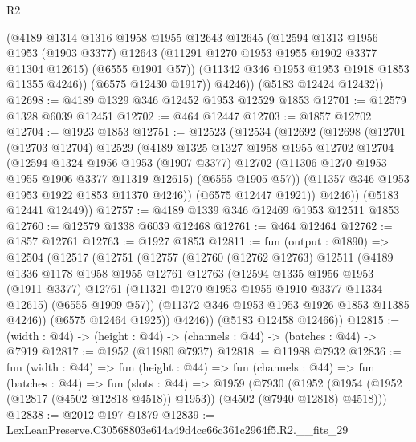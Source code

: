 \begin{lexlean}{R2}
\begin{coremodule}
            (@4189
              @1314
              @1316
              @1958
              @1955
              @12643
              @12645
              (@12594
                @1313
                @1956
                @1953
                (@1903 @3377)
                @12643
                (@11291 @1270 @1953 @1955 @1902 @3377 @11304 @12615)
                (@6555 @1901 @57))
              (@11342 @346 @1953 @1953 @1918 @1853 @11355 @4246))
            (@6575 @12430 @1917))
          @4246))
      (@5183 @12424 @12432))
@12698 := @4189 @1329 @346 @12452 @1953 @12529 @1853
@12701 := @12579 @1328 @6039 @12451
@12702 := @464 @12447
@12703 := @1857 @12702
@12704 := @1923 @1853
@12751 := @12523
    (@12534
      (@12692
        (@12698
          (@12701
            (@12703 @12704)
            @12529
            (@4189
              @1325
              @1327
              @1958
              @1955
              @12702
              @12704
              (@12594
                @1324
                @1956
                @1953
                (@1907 @3377)
                @12702
                (@11306 @1270 @1953 @1955 @1906 @3377 @11319 @12615)
                (@6555 @1905 @57))
              (@11357 @346 @1953 @1953 @1922 @1853 @11370 @4246))
            (@6575 @12447 @1921))
          @4246))
      (@5183 @12441 @12449))
@12757 := @4189 @1339 @346 @12469 @1953 @12511 @1853
@12760 := @12579 @1338 @6039 @12468
@12761 := @464 @12464
@12762 := @1857 @12761
@12763 := @1927 @1853
@12811 := fun (output : @1890) =>
  @12504
    (@12517
      (@12751
        (@12757
          (@12760
            (@12762 @12763)
            @12511
            (@4189
              @1336
              @1178
              @1958
              @1955
              @12761
              @12763
              (@12594
                @1335
                @1956
                @1953
                (@1911 @3377)
                @12761
                (@11321 @1270 @1953 @1955 @1910 @3377 @11334 @12615)
                (@6555 @1909 @57))
              (@11372 @346 @1953 @1953 @1926 @1853 @11385 @4246))
            (@6575 @12464 @1925))
          @4246))
      (@5183 @12458 @12466))
@12815 := (width : @44) -> (height : @44) -> (channels : @44) -> (batches : @44) -> @7919
@12817 := @1952 (@11980 @7937)
@12818 := @11988 @7932
@12836 := fun (width : @44) =>
  fun (height : @44) =>
  fun (channels : @44) =>
  fun (batches : @44) =>
  fun (slots : @44) =>
  @1959
    (@7930 (@1952 (@1954 (@1952 (@12817 (@4502 @12818 @4518)) @1953)) (@4502 (@7940 @12818) @4518)))
@12838 := @2012 @197 @1879
@12839 := LexLeanPreserve.C30568803e614a49d4ce66c361c2964f5.R2.__fits_29

\end{coremodule}
\end{lexlean}
